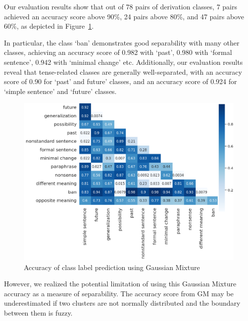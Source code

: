 \documentclass[11pt]{article}
\begin{document}
Our evaluation results show that out of 78 pairs of derivation classes, 7 pairs
achieved an accuracy score above 90\%, 24 pairs above 80\%, and 47 pairs above
60\%, as depicted in Figure~\ref{fig:GM}.

In particular, the class `ban' demonstrates good separability with many other
classes, achieving an accuracy score of 0.982 with `past', 0.980 with `formal
sentence', 0.942 with `minimal change' etc. Additionally, our evaluation results reveal that tense-related classes are generally
well-separated, with an accuracy score of 0.90 for `past' and future' classes,
and an accuracy score of 0.924 for `simple sentence' and `future' classes.

\begin{figure}[htp]
    \centering
    \includegraphics[scale=0.15]{figs/GM.png}
    \caption{Accuracy of class label prediction using Gaussian
    Mixture}\label{fig:GM}
\end{figure}

However, we realized the potential limitation of using this Gaussian Mixture accuracy as a measure of separability. The accuracy score from GM may be underestimated if two clusters are not normally distributed and the boundary between them is fuzzy.



\end{document}
